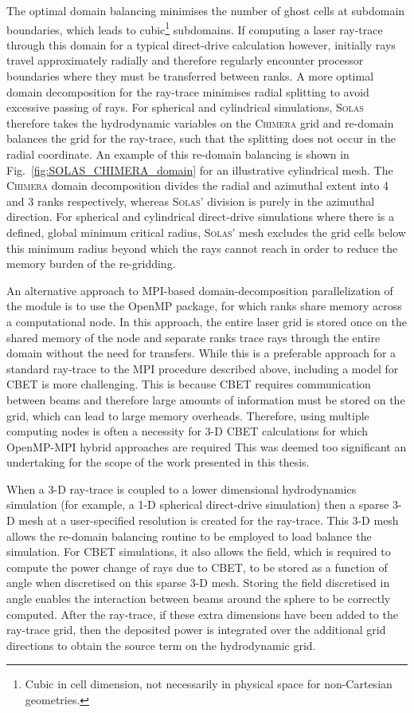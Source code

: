 The optimal domain balancing minimises the number of ghost cells at subdomain boundaries, which leads to cubic\footnote{Cubic in cell dimension, not necessarily in physical space for non-Cartesian geometries.} subdomains.
If computing a laser ray-trace through this domain for a typical direct-drive calculation however, initially rays travel approximately radially and therefore regularly encounter processor boundaries where they must be transferred between ranks.
A more optimal domain decomposition for the ray-trace minimises radial splitting to avoid excessive passing of rays.
For spherical and cylindrical simulations, \textsc{Solas} therefore takes the hydrodynamic variables on the \textsc{Chimera} grid and re-domain balances the grid for the ray-trace, such that the splitting does not occur in the radial coordinate.
An example of this re-domain balancing is shown in Fig.~\ref{fig:SOLAS_CHIMERA_domain} for an illustrative cylindrical mesh.
The \textsc{Chimera} domain decomposition divides the radial and azimuthal extent into 4 and 3 ranks respectively, whereas \textsc{Solas}' division is purely in the azimuthal direction.
For spherical and cylindrical direct-drive simulations where there is a defined, global minimum critical radius, \textsc{Solas}' mesh excludes the grid cells below this minimum radius beyond which the rays cannot reach in order to reduce the memory burden of the re-gridding.

An alternative approach to \ac{MPI}-based domain-decomposition parallelization of the module is to use the \ac{OpenMP} package, for which ranks share memory across a computational node.
In this approach, the entire laser grid is stored once on the shared memory of the node and separate ranks trace rays through the entire domain without the need for transfers.
While this is a preferable approach for a standard ray-trace to the \ac{MPI} procedure described above, including a model for \ac{CBET} is more challenging.
This is because \ac{CBET} requires communication between beams and therefore large amounts of information must be stored on the grid, which can lead to large memory overheads.
Therefore, using multiple computing nodes is often a necessity for 3-D \ac{CBET} calculations for which \ac{OpenMP}-\ac{MPI} hybrid approaches are required
This was deemed too significant an undertaking for the scope of the work presented in this thesis.

When a 3-D ray-trace is coupled to a lower dimensional hydrodynamics simulation (for example, a 1-D spherical direct-drive simulation) then a sparse 3-D mesh at a user-specified resolution is created for the ray-trace.
This 3-D mesh allows the re-domain balancing routine to be employed to load balance the simulation.
For \ac{CBET} simulations, it also allows the field, which is required to compute the power change of rays due to \ac{CBET}, to be stored as a function of angle when discretised on this sparse 3-D mesh.
Storing the field discretised in angle enables the interaction between beams around the sphere to be correctly computed.
After the ray-trace, if these extra dimensions have been added to the ray-trace grid, then the deposited power is integrated over the additional grid directions to obtain the source term on the hydrodynamic grid.


